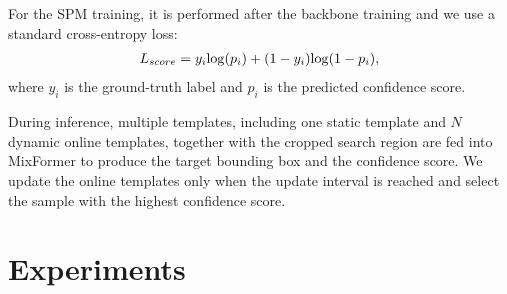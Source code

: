 For the SPM training, it is performed after the backbone training and we use a standard cross-entropy loss:
\begin{equation}
\begin{split}
L_{score} = y_i{\rm log}(p_i)+(1-y_i){\rm log}(1-p_i), 
\end{split}
\end{equation}
where $y_i$ is the ground-truth label and $p_i$ is the predicted confidence score.

 During inference, multiple templates, including one static template and $N$ dynamic online templates, together with the cropped search region are fed into MixFormer to produce the target bounding box and the confidence score. We update the online templates only when the update interval is reached and select the sample with the highest confidence score. 

\section{Experiments}

